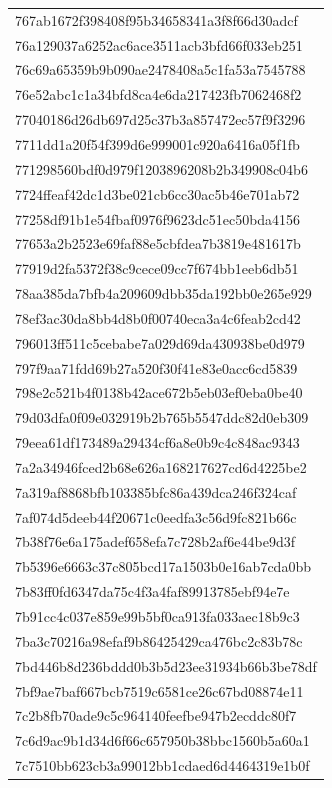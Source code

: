 \begin{tabular}{l}
767ab1672f398408f95b34658341a3f8f66d30adcf \\
76a129037a6252ac6ace3511acb3bfd66f033eb251 \\
76c69a65359b9b090ae2478408a5c1fa53a7545788 \\
76e52abc1c1a34bfd8ca4e6da217423fb7062468f2 \\
77040186d26db697d25c37b3a857472ec57f9f3296 \\
7711dd1a20f54f399d6e999001c920a6416a05f1fb \\
771298560bdf0d979f1203896208b2b349908c04b6 \\
7724ffeaf42dc1d3be021cb6cc30ac5b46e701ab72 \\
77258df91b1e54fbaf0976f9623dc51ec50bda4156 \\
77653a2b2523e69faf88e5cbfdea7b3819e481617b \\
77919d2fa5372f38c9cece09cc7f674bb1eeb6db51 \\
78aa385da7bfb4a209609dbb35da192bb0e265e929 \\
78ef3ac30da8bb4d8b0f00740eca3a4c6feab2cd42 \\
796013ff511c5cebabe7a029d69da430938be0d979 \\
797f9aa71fdd69b27a520f30f41e83e0acc6cd5839 \\
798e2c521b4f0138b42ace672b5eb03ef0eba0be40 \\
79d03dfa0f09e032919b2b765b5547ddc82d0eb309 \\
79eea61df173489a29434cf6a8e0b9c4c848ac9343 \\
7a2a34946fced2b68e626a168217627cd6d4225be2 \\
7a319af8868bfb103385bfc86a439dca246f324caf \\
7af074d5deeb44f20671c0eedfa3c56d9fc821b66c \\
7b38f76e6a175adef658efa7c728b2af6e44be9d3f \\
7b5396e6663c37c805bcd17a1503b0e16ab7cda0bb \\
7b83ff0fd6347da75c4f3a4faf89913785ebf94e7e \\
7b91cc4c037e859e99b5bf0ca913fa033aec18b9c3 \\
7ba3c70216a98efaf9b86425429ca476bc2c83b78c \\
7bd446b8d236bddd0b3b5d23ee31934b66b3be78df \\
7bf9ae7baf667bcb7519c6581ce26c67bd08874e11 \\
7c2b8fb70ade9c5c964140feefbe947b2ecddc80f7 \\
7c6d9ac9b1d34d6f66c657950b38bbc1560b5a60a1 \\
7c7510bb623cb3a99012bb1cdaed6d4464319e1b0f \\

\end{tabular}
